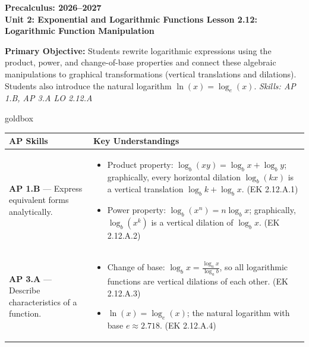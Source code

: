 \documentclass[10pt]{article}
\newcommand{\CourseName}{Precalculus}
\newcommand{\SchoolYear}{2026--2027}
\newcommand{\UnitNumberName}{Unit 2: Exponential and Logarithmic Functions \quad}
\newcommand{\LessonNumberName}{Lesson 2.12: Logarithmic Function Manipulation}
\begin{document}
\begin{center}
    {\Large\bfseries \CourseName: \SchoolYear \\
    {\small\bfseries \UnitNumberName \LessonNumberName}}
\end{center}

\begin{tcolorbox}[colback=sky, colframe=navy, boxrule=0.9pt, arc=2mm,
    left=2mm, right=2mm, top=1.5mm, bottom=1.5mm]
    \textbf{Primary Objective:} Students rewrite logarithmic expressions using the product,
    power, and change-of-base properties and connect these algebraic manipulations to graphical
    transformations (vertical translations and dilations). Students also introduce the natural
    logarithm $\ln(x) = \log_e(x)$.
    \hfill\textit{\small Skills: AP 1.B, AP 3.A \quad LO 2.12.A}
\end{tcolorbox}

\renewcommand{\arraystretch}{1.6}
\begin{skillbox}{goldbox}
\begin{tabularx}{\linewidth}{@{}X X@{}}
\textbf{AP Skills} &
\textbf{Key Understandings} \\
\midrule
\textbf{AP 1.B} --- Express equivalent forms analytically. &
\begin{itemize}[leftmargin=1.2em,itemsep=2pt,topsep=0pt]
  \item Product property: $\log_b(xy) = \log_b x + \log_b y$; graphically, every
        horizontal dilation $\log_b(kx)$ is a vertical translation $\log_b k + \log_b x$.
        (EK 2.12.A.1)
  \item Power property: $\log_b(x^n) = n\log_b x$; graphically, $\log_b(x^k)$ is a
        vertical dilation of $\log_b x$. (EK 2.12.A.2)
\end{itemize} \\
\textbf{AP 3.A} --- Describe characteristics of a function. &
\begin{itemize}[leftmargin=1.2em,itemsep=2pt,topsep=0pt]
  \item Change of base: $\log_b x = \tfrac{\log_a x}{\log_a b}$, so all logarithmic
        functions are vertical dilations of each other. (EK 2.12.A.3)
  \item $\ln(x) = \log_e(x)$; the natural logarithm with base $e \approx 2.718$.
        (EK 2.12.A.4)
\end{itemize} \\
\end{tabularx}
\end{skillbox}
\end{document}
